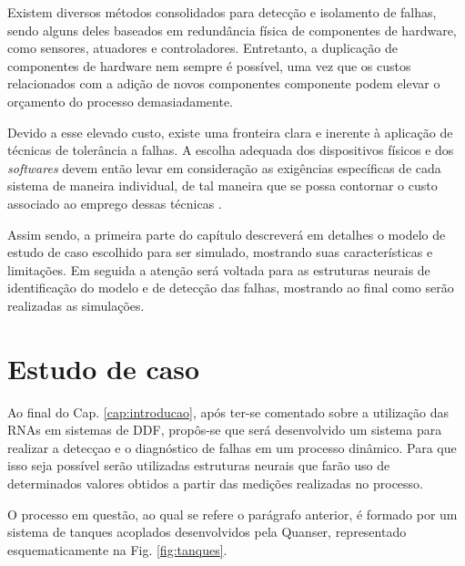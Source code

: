 \label{cap:sistema}
Existem diversos métodos consolidados para detecção e isolamento de falhas,
sendo alguns deles baseados em redundância física de componentes de hardware,
como sensores, atuadores e controladores. Entretanto, a duplicação de
componentes de hardware nem sempre é possível, uma vez que os custos
relacionados com a adição de novos componentes componente podem elevar o
orçamento do processo demasiadamente.

Devido a esse elevado custo, existe uma fronteira clara e inerente à aplicação
de técnicas de tolerância a falhas. A escolha adequada dos dispositivos físicos
e dos {\it softwares} devem então levar em consideração as exigências
específicas de cada sistema de maneira individual, de tal maneira que se possa
contornar o custo associado ao emprego dessas técnicas \cite{weber:2002}.

Assim sendo, a primeira parte do capítulo descreverá em detalhes o modelo de
estudo de caso escolhido para ser simulado, mostrando suas características e
limitações. Em seguida a atenção será voltada para as estruturas neurais de
identificação do modelo e de detecção das falhas, mostrando ao final como serão
realizadas as simulações.

\section{Estudo de caso}
Ao final do Cap. \ref{cap:introducao}, após ter-se comentado sobre a utilização
das RNAs em sistemas de DDF, propôs-se que será desenvolvido um sistema para
realizar a detecçao e o diagnóstico de falhas em um processo dinâmico. Para que
isso seja possível serão utilizadas estruturas neurais que farão uso de
determinados valores obtidos a partir das medições realizadas no processo.

O processo em questão, ao qual se refere o parágrafo anterior, é formado por um
sistema de tanques acoplados desenvolvidos pela Quanser\reg, representado
esquematicamente na Fig. \ref{fig:tanques}.

